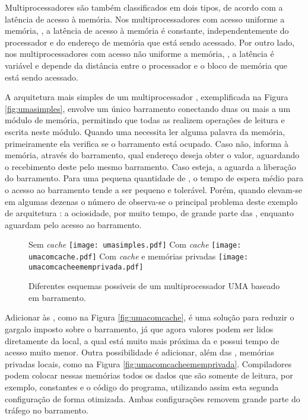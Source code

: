 Multiprocessadores são também classificados em dois tipos, de acordo com a latência de acesso à memória. Nos multiprocessadores com acesso uniforme a memória, \textit{\UMA}, a latência de acesso à memória é constante, independentemente do processador e do endereço de memória que está sendo acessado. Por outro lado, nos multiprocessadores com acesso não uniforme a memória, \textit{\NUMA}, a latência é variável e depende da distância entre o processador e o bloco de memória que está sendo acessado.

A arquitetura mais simples de um multiprocessador \UMA, exemplificada na Figura \ref{fig:umasimples}, envolve um único barramento conectando duas ou mais \CPUs a um módulo de memória, permitindo que todas as \CPUs realizem operações de leitura e escrita neste módulo. Quando uma \CPU necessita ler alguma palavra da memória, primeiramente ela verifica se o barramento está ocupado. Caso não, informa à memória, através do barramento, qual endereço deseja obter o valor, aguardando o recebimento deste pelo mesmo barramento. Caso esteja, a \CPU aguarda a liberação do barramento. Para uma pequena quantidade de \CPUs, o tempo de espera médio para o acesso ao barramento tende a ser pequeno e tolerável. Porém, quando elevam-se em algumas dezenas o número de \CPUs observa-se o principal problema deste exemplo de arquitetura \UMA: a ociosidade, por muito tempo, de grande parte das \CPUs, enquanto aguardam pelo acesso ao barramento.

\begin{figure}[tb]
  \centering
  \caption{Diferentes esquemas possiveis de um multiprocessador UMA baseado em barramento.}
    {Sem \textit{cache}}%
    {\texttt{[image: umasimples.pdf]}}%
  \hfill%
    {Com \textit{cache}}%
    {\texttt{[image: umacomcache.pdf]}}%
  \hfill%
    {Com \textit{cache} e memórias privadas}%
    {\texttt{[image: umacomcacheememprivada.pdf]}}%
  \hfill%
\end{figure}

Adicionar \caches às \CPUs, como na Figura \ref{fig:umacomcache}, é uma solução para reduzir o gargalo imposto sobre o barramento, já que agora valores podem ser lidos diretamente da \cache local, a qual está muito mais próxima da \CPU e possui tempo de acesso muito menor. Outra possibilidade é adicionar, além das \caches, memórias privadas locais,  como na Figura \ref{fig:umacomcacheememprivada}. Compiladores podem colocar nessas memórias todos os dados que são somente de leitura, por exemplo, constantes e o código do programa, utilizando assim esta segunda configuração de forma otimizada. Ambas configurações removem grande parte do tráfego no barramento.

